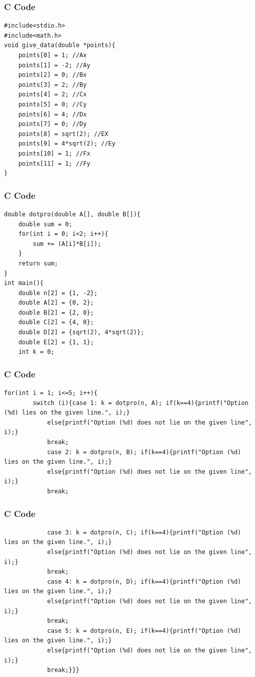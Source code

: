 \documentclass{beamer}
\begin{document}
\begin{frame}[fragile]
    \frametitle{C Code}
    \begin{lstlisting}
#include<stdio.h>
#include<math.h>
void give_data(double *points){
    points[0] = 1; //Ax
    points[1] = -2; //Ay
    points[2] = 0; //Bx
    points[3] = 2; //By
    points[4] = 2; //Cx
    points[5] = 0; //Cy
    points[6] = 4; //Dx
    points[7] = 0; //Dy
    points[8] = sqrt(2); //EX
    points[9] = 4*sqrt(2); //Ey
    points[10] = 1; //Fx
    points[11] = 1; //Fy
}
    \end{lstlisting}
\end{frame}

\begin{frame}[fragile]
    \frametitle{C Code}
    \begin{lstlisting}
double dotpro(double A[], double B[]){
    double sum = 0;
    for(int i = 0; i<2; i++){
        sum += (A[i]*B[i]);
    }
    return sum;
}
int main(){
    double n[2] = {1, -2};
    double A[2] = {0, 2};
    double B[2] = {2, 0};
    double C[2] = {4, 0};
    double D[2] = {sqrt(2), 4*sqrt(2)};
    double E[2] = {1, 1};
    int k = 0;
    \end{lstlisting}
\end{frame}

\begin{frame}[fragile]
    \frametitle{C Code}
    \begin{lstlisting}
for(int i = 1; i<=5; i++){
        switch (i){case 1: k = dotpro(n, A); if(k==4){printf("Option (%d) lies on the given line.", i);}
            else{printf("Option (%d) does not lie on the given line", i);}
            break;
            case 2: k = dotpro(n, B); if(k==4){printf("Option (%d) lies on the given line.", i);}
            else{printf("Option (%d) does not lie on the given line", i);}
            break;
    \end{lstlisting}
\end{frame}

\begin{frame}[fragile]
    \frametitle{C Code}
    \begin{lstlisting}
            case 3: k = dotpro(n, C); if(k==4){printf("Option (%d) lies on the given line.", i);}
            else{printf("Option (%d) does not lie on the given line", i);}
            break;
            case 4: k = dotpro(n, D); if(k==4){printf("Option (%d) lies on the given line.", i);}
            else{printf("Option (%d) does not lie on the given line", i);}
            break;
            case 5: k = dotpro(n, E); if(k==4){printf("Option (%d) lies on the given line.", i);}
            else{printf("Option (%d) does not lie on the given line", i);}
            break;}}}
    \end{lstlisting}
\end{frame}
\end{document}
